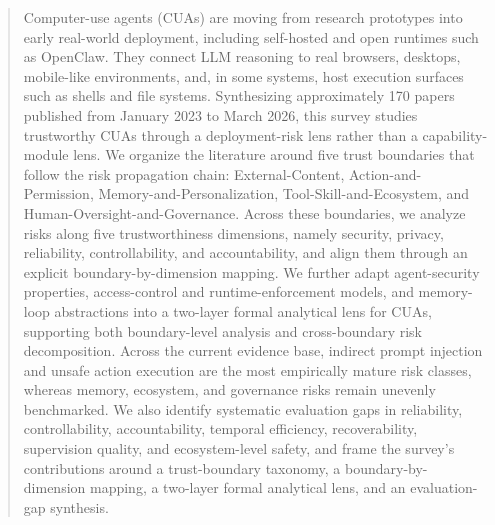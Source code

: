 \author{Qiannan Li}

\author{Jessica Jin Ouyang}

\author{Latifur Khan}

\author{Feng Chen}

\author{Bingzhe Li}
\authornotemark[1]

\renewcommand{\shortauthors}{Hu et al.}



\begin{abstract}
Computer-use agents (CUAs) are moving from research prototypes into early real-world deployment, including self-hosted and open runtimes such as OpenClaw. They connect LLM reasoning to real browsers, desktops, mobile-like environments, and, in some systems, host execution surfaces such as shells and file systems. Synthesizing approximately 170 papers published from January 2023 to March 2026, this survey studies trustworthy CUAs through a deployment-risk lens rather than a capability-module lens. We organize the literature around five trust boundaries that follow the risk propagation chain: External-Content, Action-and-Permission, Memory-and-Personalization, Tool-Skill-and-Ecosystem, and Human-Oversight-and-Governance. Across these boundaries, we analyze risks along five trustworthiness dimensions, namely security, privacy, reliability, controllability, and accountability, and align them through an explicit boundary-by-dimension mapping. We further adapt agent-security properties, access-control and runtime-enforcement models, and memory-loop abstractions into a two-layer formal analytical lens for CUAs, supporting both boundary-level analysis and cross-boundary risk decomposition. Across the current evidence base, indirect prompt injection and unsafe action execution are the most empirically mature risk classes, whereas memory, ecosystem, and governance risks remain unevenly benchmarked. We also identify systematic evaluation gaps in reliability, controllability, accountability, temporal efficiency, recoverability, supervision quality, and ecosystem-level safety, and frame the survey's contributions around a trust-boundary taxonomy, a boundary-by-dimension mapping, a two-layer formal analytical lens, and an evaluation-gap synthesis.
\end{abstract}

